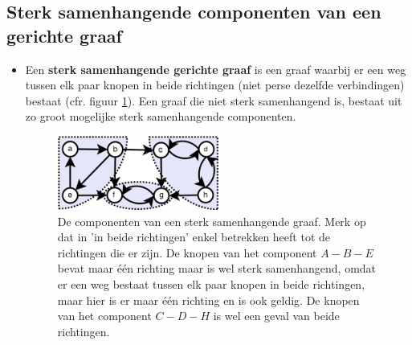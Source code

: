 \subsection{Sterk samenhangende componenten van een gerichte graaf}
\begin{itemize}
	\item Een \textbf{sterk samenhangende gerichte graaf} is een graaf waarbij er een weg tussen elk paar knopen in beide richtingen (niet perse dezelfde verbindingen) bestaat (cfr. figuur \ref{fig:sterk_samenhangende_graaf}). Een graaf die niet sterk samenhangend is, bestaat uit zo groot mogelijke sterk samenhangende componenten. 
	\begin{figure}[ht]
		\centering
		\includegraphics[width=0.5\textwidth]{img/sterk_samenhangende_graaf}
		\caption{De componenten van een sterk samenhangende graaf. Merk op dat in 'in beide richtingen' enkel betrekken heeft tot de richtingen die er zijn. De knopen van het component $A - B - E$ bevat maar één richting maar is wel sterk samenhangend, omdat er een weg bestaat tussen elk paar knopen in beide richtingen, maar hier is er maar één richting en is ook geldig. De knopen van het component $C - D - H$ is wel een geval van beide richtingen.}
		\label{fig:sterk_samenhangende_graaf}
	\end{figure}
				

\end{itemize}
